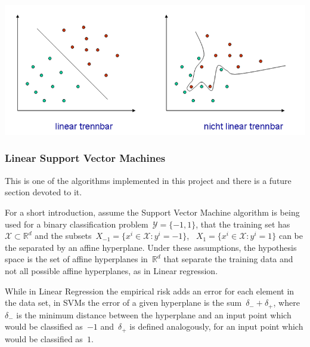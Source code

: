 \includegraphics[scale=0.5]{Images/svm.png}


\subsubsection{Linear Support Vector Machines}

This is one of the algorithms implemented in this project and there is a future section devoted to it. 

For a short introduction, assume the Support Vector Machine algorithm is being used for a binary classification problem~$\mathcal{Y} = \{-1, 1\}$, that the training set has~$\mathcal{X} \subset \mathbb{R}^d$ and the subsets~$X_{-1} = \{ x^i\in \mathcal{X} \colon y^i = -1 \}$, ~$X_{1} = \{ x^i\in \mathcal{X} \colon y^i = 1 \}$ can be the separated by an affine hyperplane. Under these assumptions, the hypothesis space is the set of affine hyperplanes in~$\mathbb{R}^d$ that separate the training data and not all possible affine hyperplanes, as in Linear regression.

While in Linear Regression the empirical risk adds an error for each element in the data set, in SVMs the error of a given hyperplane is the sum~$\delta_{-} + \delta_{+}$, where~$\delta_{-}$ is the minimum distance between the hyperplane and an input point which would be classified as~$-1$ and~$\delta_{+}$ is defined analogously, for an input point which would be classified as~$1$.


